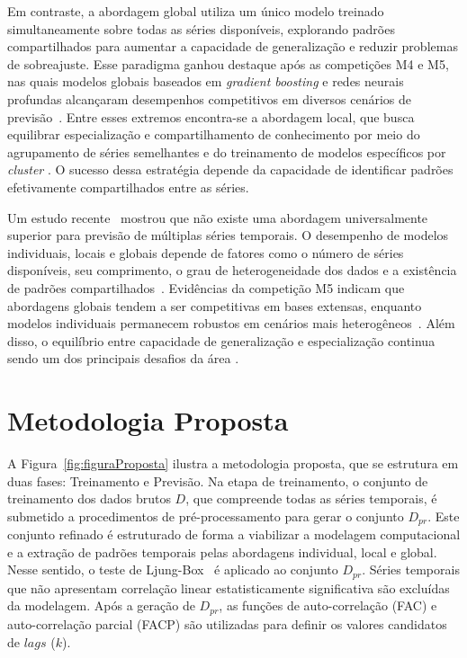 \documentclass[12pt]{article}
\begin{document}
Em contraste, a abordagem global utiliza um único modelo treinado simultaneamente sobre todas as séries disponíveis, explorando padrões compartilhados para aumentar a capacidade de generalização e reduzir problemas de sobreajuste. Esse paradigma ganhou destaque após as competições M4 e M5, nas quais modelos globais baseados em \textit{gradient boosting} e redes neurais profundas alcançaram desempenhos competitivos em diversos cenários de previsão~\cite{makridakis2018m4, makridakis2022m5}. Entre esses extremos encontra-se a abordagem local, que busca equilibrar especialização e compartilhamento de conhecimento por meio do agrupamento de séries semelhantes e do treinamento de modelos específicos por \textit{cluster} \cite{bandara2020forecasting}. O sucesso dessa estratégia depende da capacidade de identificar padrões efetivamente compartilhados entre as séries.

Um estudo recente~\cite{aksu2024gift} mostrou que não existe uma abordagem universalmente superior para previsão de múltiplas séries temporais. O desempenho de modelos individuais, locais e globais depende de fatores como o número de séries disponíveis, seu comprimento, o grau de heterogeneidade dos dados e a existência de padrões compartilhados~\cite{montero2021principles}. Evidências da competição M5 indicam que abordagens globais tendem a ser competitivas em bases extensas, enquanto modelos individuais permanecem robustos em cenários mais heterogêneos~\cite{makridakis2018m4, makridakis2022m5}. Além disso, o equilíbrio entre capacidade de generalização e especialização continua sendo um dos principais desafios da área \cite{petropoulos2022forecasting, masini2023machine}. 

\section{Metodologia Proposta}\label{sec:metodo}

A Figura~\ref{fig:figuraProposta} ilustra a metodologia proposta, que se estrutura em duas fases: Treinamento e Previsão. Na etapa de treinamento, o conjunto de treinamento dos dados brutos $D$, que compreende todas as séries temporais, é submetido a procedimentos de pré-processamento para gerar o conjunto $D_{pr}$. Este conjunto refinado é estruturado de forma a viabilizar a modelagem computacional e a extração de padrões temporais pelas abordagens individual, local e global. Nesse sentido, o teste de Ljung-Box~\cite{box2008time} é aplicado ao conjunto $D_{pr}$. Séries temporais que não apresentam correlação linear estatisticamente significativa são excluídas da modelagem. Após a geração de $D_{pr}$, as funções de auto-correlação (FAC) e auto-correlação parcial (FACP) são utilizadas para definir os valores candidatos de $lags$ ($k$). 
\end{document}
